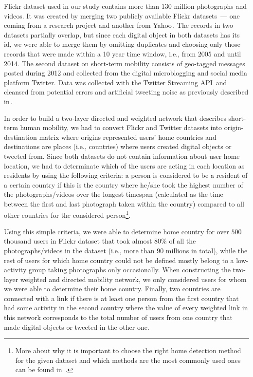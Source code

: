 \documentclass[aps,superscriptaddress,showkeys,nofootinbib]{revtex4-1}
\begin{document}
Flickr dataset used in our study contains more than $130$ million photographs and videos. It was created by merging two publicly available Flickr datasets~--- one coming from a research project and another from Yahoo\,\cite{flickr1,thomee2015yfcc100m}. The records in two datasets partially overlap, but since each digital object in both datasets has its id, we were able to merge them by omitting duplicates and choosing only those records that were made within a 10 year time window, i.e., from 2005 and until 2014. The second dataset on short-term mobility consists of geo-tagged messages posted during 2012 and collected from the digital microblogging and social media platform Twitter. Data was collected with the Twitter Streaming API\,\cite{twitterapi} and cleansed from potential errors and artificial tweeting noise as previously described in\,\cite{hawelka2014}.

In order to build a two-layer directed and weighted network that describes short-term human mobility, we had to convert Flickr and Twitter datasets into origin-destination matrix where origins represented users' home countries and destinations are places (i.e., countries) where users created digital objects or tweeted from. Since both datasets do not contain information about user home location, we had to determinate which of the users are acting in each location as residents by using the following criteria: a person is considered to be a resident of a certain country if this is the country where he/she took the highest number of the photographs/videos over the longest timespan (calculated as the time between the first and last photograph taken within the country) compared to all other countries for the considered person\footnote{More about why it is important to choose the right home detection method for the given dataset and which methods are the most commonly used ones can be found in~\cite{bojic2015choosing}.}.

Using this simple criteria, we were able to determine home country for over $500$ thousand users in Flickr dataset that took almost $80\%$ of all the photographs/videos in the dataset (i.e., more than $90$ millions in total), while the rest of users for which home country could not be defined mostly belong to a low-activity group taking photographs only occasionally. When constructing the two-layer weighted and directed mobility network, we only considered users for whom we were able to determine their home country. Finally, two countries are connected with a link if there is at least one person from the first country that had some activity in the second country where the value of every weighted link in this network corresponds to the total number of users from one country that made digital objects or tweeted in the other one.
\end{document}
